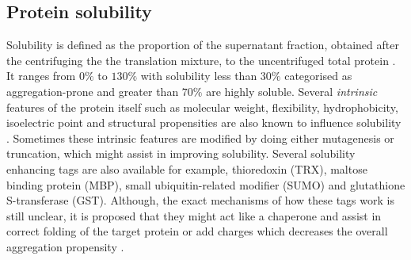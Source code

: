 \subsection{Protein solubility}




Solubility is defined as the proportion of the supernatant fraction, obtained after the centrifuging the the translation mixture, to the uncentrifuged total protein \cite{Niwa2009-ye}. It ranges from $0\%$ to $130\%$ with solubility less than $30\%$ categorised as aggregation-prone and greater than $70\%$ are highly soluble. Several \textit{intrinsic} features of the protein itself such as molecular weight, flexibility, hydrophobicity, isoelectric point and structural propensities are also known to influence solubility \cite{Wilkinson1991-zp, Chiti2003-zk, Tartaglia2004-wm, Diaz2010-md}. Sometimes these intrinsic features are modified by doing either mutagenesis or truncation, which might assist in improving solubility. Several solubility enhancing tags are also available for example, thioredoxin (TRX), maltose binding protein (MBP), small ubiquitin-related modifier (SUMO) and glutathione S-transferase (GST). Although, the exact mechanisms of how these tags work is still unclear, it is proposed that they might act like a chaperone and assist in correct folding of the target protein or add charges which decreases the overall aggregation propensity \cite{Costa2014-oe}.

